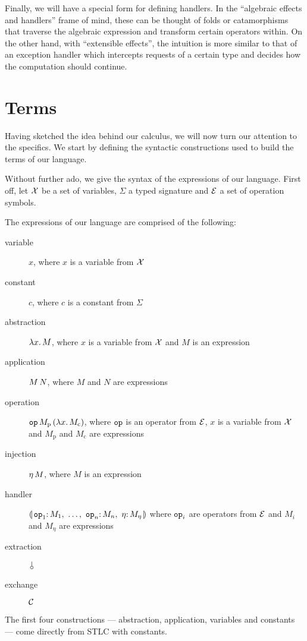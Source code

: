 Finally, we will have a special form for defining handlers. In the
``algebraic effects and handlers'' frame of mind, these can be thought of
folds or catamorphisms that traverse the algebraic expression and transform
certain operators within. On the other hand, with ``extensible effects'',
the intuition is more similar to that of an exception handler which
intercepts requests of a certain type and decides how the computation
should continue.

\section{Terms}

Having sketched the idea behind our calculus, we will now turn our
attention to the specifics. We start by defining the syntactic
constructions used to build the terms of our language.

Without further ado, we give the syntax of the expressions of our
language. First off, let $\mathcal{X}$ be a set of variables, $\Sigma$ a typed
signature and $\mathcal{E}$ a set of operation symbols.

The expressions of our language are comprised of the following:
\begin{description}
  \item[variable] $x$, where $x$ is a variable from $\mathcal{X}$
  \item[constant] $c$, where $c$ is a constant from $\Sigma$
  \item[abstraction] $\lambda x.\, M$, where $x$ is a variable from $\mathcal{X}$ and
    $M$ is an expression
  \item[application] $M\,N$, where $M$ and $N$ are expressions
  \item[operation]
    $\mathtt{op}\,M_{\mathrm{p}}\,(\lambda x.\, M_{\mathrm{c}})$, where
    $\mathtt{op}$ is an operator from $\mathcal{E}$, $x$ is a variable from $\mathcal{X}$ and
    $M_{\mathrm{p}}$ and $M_{\mathrm{c}}$ are expressions
  \item[injection] $\eta\,M$, where $M$ is an expression
  \item[handler] $\cdbanana$
    where $\mathtt{op}_i$ are operators from $\mathcal{E}$ and $M_i$ and $M_\eta$ are
    expressions
  \item[extraction] $\cherry$
  \item[exchange] $\mathcal{C}$
\end{description}

The first four constructions --- abstraction, application, variables and
constants --- come directly from STLC with constants.

